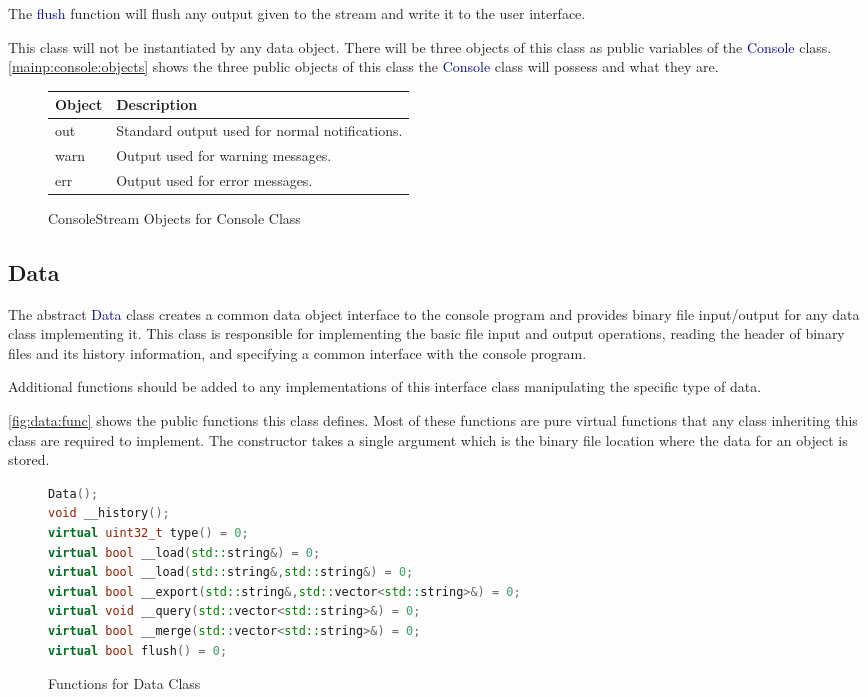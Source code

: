 \documentclass[10pt]{article}
\providecommand{\h}[1]{\textcolor{darkblue}{#1}}
\begin{document}
The \h{flush} function will flush any output given to the stream and write it 
to the user interface.

This class will not be instantiated by any data object. There will be three 
objects of this class as public variables of the \h{Console} class. 
\autoref{mainp:console:objects} shows the three public objects of this class 
the \h{Console} class will possess and what they are.

\begin{figure}[H]
\begin{mdframed}[style=vtable]
\begin{tabularx}{\textwidth}{|l|X|}
\hline
\textbf{Object} & \textbf{Description} \\
\hline
out & Standard output used for normal notifications. \\
\hline
warn & Output used for warning messages. \\
\hline
err & Output used for error messages. \\
\hline
\end{tabularx}
\end{mdframed}
\caption{ConsoleStream Objects for Console Class}
\label{mainp:console:objects}
\end{figure}

\subsection{Data}

The abstract \h{Data} class creates a common data object interface to the 
console program and provides binary file input/output for any data class 
implementing it. This class is responsible for implementing the basic file input 
and output operations, reading the header of binary files and its history 
information, and specifying a common interface with the console program.

Additional functions should be added to any implementations of this interface 
class manipulating the specific type of data.

\autoref{fig:data:func} shows the public functions this class defines. Most of 
these functions are pure virtual functions that any class inheriting this class 
are required to implement. The constructor takes a single argument which is the 
binary file location where the data for an object is stored.

\begin{figure}[H]
\begin{mdframed}[style=functions]
\begin{lstlisting}[language=C++]
Data();
void __history();
virtual uint32_t type() = 0;
virtual bool __load(std::string&) = 0;
virtual bool __load(std::string&,std::string&) = 0;
virtual bool __export(std::string&,std::vector<std::string>&) = 0;
virtual void __query(std::vector<std::string>&) = 0;
virtual bool __merge(std::vector<std::string>&) = 0;
virtual bool flush() = 0;
\end{lstlisting}
\end{mdframed}
\caption{Functions for Data Class}
\label{fig:data:func}
\end{figure}
\end{document}

